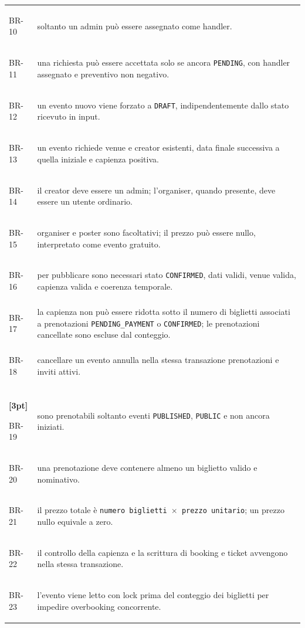 \begin{longtable}{@{}>{\raggedright\arraybackslash\bfseries}p{1.4cm}>{\raggedright\arraybackslash}p{\dimexpr\textwidth-1.4cm-2\tabcolsep\relax}@{}}
\strut\label{br:BR-10}BR-10 & soltanto un admin può essere assegnato come handler. \\[4pt]
\strut\label{br:BR-11}BR-11 & una richiesta può essere accettata solo se ancora \texttt{PENDING}, con handler assegnato e preventivo non negativo. \\[4pt]
\strut\label{br:BR-12}BR-12 & un evento nuovo viene forzato a \texttt{DRAFT}, indipendentemente dallo stato ricevuto in input. \\[4pt]
\strut\label{br:BR-13}BR-13 & un evento richiede venue e creator esistenti, data finale successiva a quella iniziale e capienza positiva. \\[4pt]
\strut\label{br:BR-14}BR-14 & il creator deve essere un admin; l'organiser, quando presente, deve essere un utente ordinario. \\[4pt]
\strut\label{br:BR-15}BR-15 & organiser e poster sono facoltativi; il prezzo può essere nullo, interpretato come evento gratuito. \\[4pt]
\strut\label{br:BR-16}BR-16 & per pubblicare sono necessari stato \texttt{CONFIRMED}, dati validi, venue valida, capienza valida e coerenza temporale. \\[4pt]
\strut\label{br:BR-17}BR-17 & la capienza non può essere ridotta sotto il numero di biglietti associati a prenotazioni \texttt{PENDING\_PAYMENT} o \texttt{CONFIRMED}; le prenotazioni cancellate sono escluse dal conteggio. \\[4pt]
\strut\label{br:BR-18}BR-18 & cancellare un evento annulla nella stessa transazione prenotazioni e inviti attivi. \\[4pt]
\rowcolor{etichetteUC}
\multicolumn{2}{@{}l}{\rule{0pt}{2.6ex}\textbf{Prenotazioni e invitati}} \\*[3pt]
\strut\label{br:BR-19}BR-19 & sono prenotabili soltanto eventi \texttt{PUBLISHED}, \texttt{PUBLIC} e non ancora iniziati. \\[4pt]
\strut\label{br:BR-20}BR-20 & una prenotazione deve contenere almeno un biglietto valido e nominativo. \\[4pt]
\strut\label{br:BR-21}BR-21 & il prezzo totale è \texttt{numero biglietti \ensuremath{\times} prezzo unitario}; un prezzo nullo equivale a zero. \\[4pt]
\strut\label{br:BR-22}BR-22 & il controllo della capienza e la scrittura di booking e ticket avvengono nella stessa transazione. \\[4pt]
\strut\label{br:BR-23}BR-23 & l'evento viene letto con lock prima del conteggio dei biglietti per impedire overbooking concorrente. \\[4pt]

\end{longtable}
